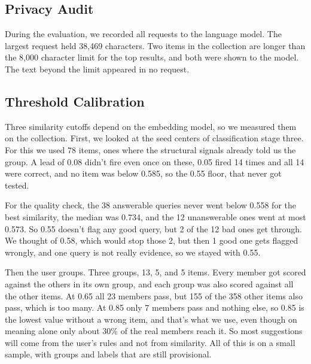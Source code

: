 \documentclass[conference]{IEEEtran}
\begin{document}
\subsection{Privacy Audit}
During the evaluation, we recorded all requests to the language model. The largest request held 38,469 characters. Two items in the collection are longer than the 8,000 character limit for the top results, and both were shown to the model. The text beyond the limit appeared in no request.

\subsection{Threshold Calibration}
Three similarity cutoffs depend on the embedding model, so we measured them on the collection. First, we looked at the seed centers of classification stage three. For this we used 78 items, ones where the structural signals already told us the group. A lead of 0.08 didn't fire even once on these, 0.05 fired 14 times and all 14 were correct, and no item was below 0.585, so the 0.55 floor, that never got tested.

For the quality check, the 38 answerable queries never went below 0.558 for the best similarity, the median was 0.734, and the 12 unanswerable ones went at most 0.573. So 0.55 doesn't flag any good query, but 2 of the 12 bad ones get through. We thought of 0.58, which would stop those 2, but then 1 good one gets flagged wrongly, and one query is not really evidence, so we stayed with 0.55.

Then the user groups. Three groups, 13, 5, and 5 items. Every member got scored against the others in its own group, and each group was also scored against all the other items. At 0.65 all 23 members pass, but 155 of the 358 other items also pass, which is too many. At 0.85 only 7 members pass and nothing else, so 0.85 is the lowest value without a wrong item, and that's what we use, even though on meaning alone only about 30\% of the real members reach it. So most suggestions will come from the user's rules and not from similarity. All of this is on a small sample, with groups and labels that are still provisional.

\end{document}

